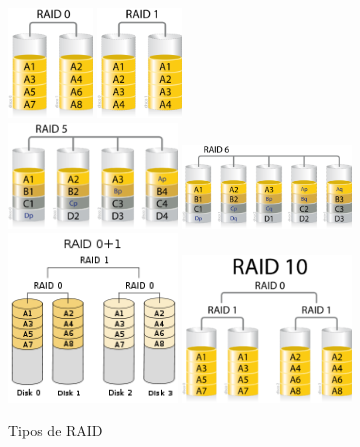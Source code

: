 \documentclass[12pt,spanish]{article}
\begin{document}
\begin{figure}[H]
  \centering
  \includegraphics[width=0.2\textwidth]{raid0.png}
  \hspace{0.5cm}
  \includegraphics[width=0.2\textwidth]{raid1.png}
  \\
  \includegraphics[width=0.4\textwidth]{raid5.png}
  \hspace{0.5cm}
  \includegraphics[width=0.4\textwidth]{raid6.png}
  \\
  \includegraphics[width=0.4\textwidth]{raid01.png}
  \hspace{0.5cm}
  \includegraphics[width=0.4\textwidth]{raid10.png}
  \caption{Tipos de RAID}
\end{figure}
\end{document}
